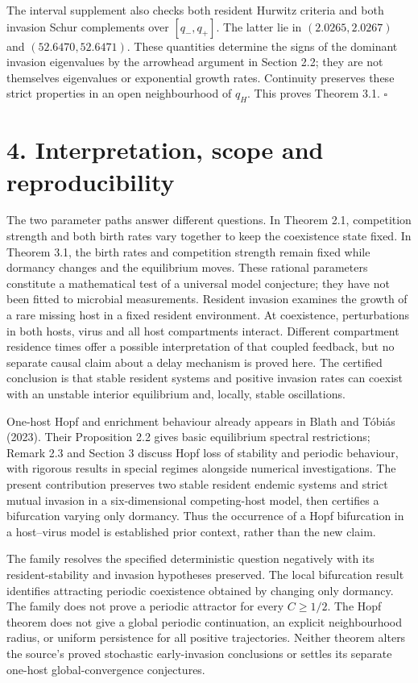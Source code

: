 \documentclass[
  11pt,
]{article}
\begin{document}
The interval supplement also checks both resident Hurwitz criteria and
both invasion Schur complements over \([q_-,q_+]\). The latter lie in
\((2.0265,2.0267)\) and \((52.6470,52.6471)\). These quantities
determine the signs of the dominant invasion eigenvalues by the
arrowhead argument in Section 2.2; they are not themselves eigenvalues
or exponential growth rates. Continuity preserves these strict
properties in an open neighbourhood of \(q_H\). This proves Theorem 3.1.
\(\square\)

\section{4. Interpretation, scope and
reproducibility}\label{interpretation-scope-and-reproducibility}

The two parameter paths answer different questions. In Theorem 2.1,
competition strength and both birth rates vary together to keep the
coexistence state fixed. In Theorem 3.1, the birth rates and competition
strength remain fixed while dormancy changes and the equilibrium moves.
These rational parameters constitute a mathematical test of a universal
model conjecture; they have not been fitted to microbial measurements.
Resident invasion examines the growth of a rare missing host in a fixed
resident environment. At coexistence, perturbations in both hosts, virus
and all host compartments interact. Different compartment residence
times offer a possible interpretation of that coupled feedback, but no
separate causal claim about a delay mechanism is proved here. The
certified conclusion is that stable resident systems and positive
invasion rates can coexist with an unstable interior equilibrium and,
locally, stable oscillations.

One-host Hopf and enrichment behaviour already appears in Blath and
Tóbiás (2023). Their Proposition 2.2 gives basic equilibrium spectral
restrictions; Remark 2.3 and Section 3 discuss Hopf loss of stability
and periodic behaviour, with rigorous results in special regimes
alongside numerical investigations. The present contribution preserves
two stable resident endemic systems and strict mutual invasion in a
six-dimensional competing-host model, then certifies a bifurcation
varying only dormancy. Thus the occurrence of a Hopf bifurcation in a
host--virus model is established prior context, rather than the new
claim.

The family resolves the specified deterministic question negatively with
its resident-stability and invasion hypotheses preserved. The local
bifurcation result identifies attracting periodic coexistence obtained
by changing only dormancy. The family does not prove a periodic
attractor for every \(C\geq1/2\). The Hopf theorem does not give a
global periodic continuation, an explicit neighbourhood radius, or
uniform persistence for all positive trajectories. Neither theorem
alters the source's proved stochastic early-invasion conclusions or
settles its separate one-host global-convergence conjectures.
\end{document}
